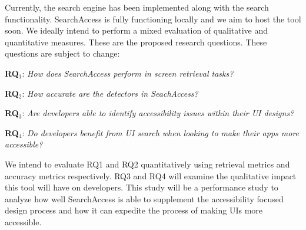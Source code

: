Currently, the search engine has been implemented along with the search functionality. SearchAccess is fully functioning locally and we aim to host the tool soon. We ideally intend to perform a mixed evaluation of qualitative and quantitative measures. 
These are the proposed research questions. These questions are subject to change: 
\begin{description}
  
    \item \textbf{RQ$_1$}: \textit{How does SearchAccess perform in screen retrieval tasks?}
    \item \textbf{RQ$_2$}: \textit{How accurate are the detectors in SeachAccess?}
    \item \textbf{RQ$_3$}: \textit{Are developers able to identify accessibility issues within their UI designs?}
    \item \textbf{RQ$_4$}: \textit{Do developers benefit from UI search when looking to make their apps more accessible?}

 \end{description}

We intend to evaluate RQ1 and RQ2 quantitatively using retrieval metrics and accuracy metrics respectively. RQ3 and RQ4 will examine the qualitative impact this tool will have on developers. This study will be a performance study to analyze how well SearchAccess is able to supplement the accessibility focused design process and how it can expedite the process of making UIs more accessible. 













